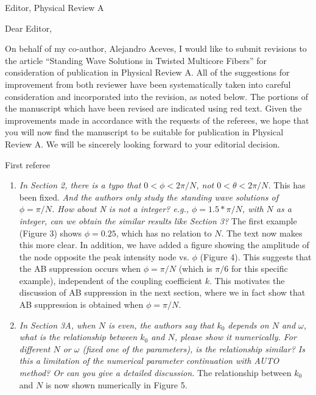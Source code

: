 \documentclass[11pt]{letter}
\begin{document}
\address{Ross Parker \\
Department of Mathematics \\
Southern Methodist University \\
Dallas, TX 75275 \\
\texttt{rhparker@smu.edu}}%
\signature{Ross Parker}
\begin{letter}{Editor, Physical Review A}

\opening{Dear Editor,}

On behalf of my co-author, Alejandro Aceves, I would like to submit revisions to the article ``Standing Wave Solutions in Twisted Multicore Fibers'' for consideration of publication in Physical Review A. All of the suggestions for improvement from both reviewer have been systematically taken into careful consideration and incorporated into the revision, as noted below. The portions of the manuscript which have been revised are indicated using red text. Given the improvements made in accordance with the requests of the referees, we hope that you will now find the manuscript to be suitable for publication in Physical Review A. We will be sincerely looking forward to your editorial decision.

First referee
\begin{enumerate}
\item \emph{In Section 2, there is a typo that $0<\phi<2\pi/N$, not $0<\theta<2\pi/N$.} This has been fixed. \emph{And the authors only study the standing wave solutions of $\phi=\pi/N$. How about N is not a integer? e.g., $\phi=1.5*\pi/N$, with $N$ as a integer, can we obtain the similar results like Section 3?} The first example (Figure 3) shows $\phi = 0.25$, which has no relation to $N$. The text now makes this more clear. In addition, we have added a figure showing the amplitude of the node opposite the peak intensity node vs. $\phi$ (Figure 4). This suggests that the AB suppression occurs when $\phi = \pi/N$ (which is $\pi/6$ for this specific example), independent of the coupling coefficient $k$. This motivates the discussion of AB suppression in the next section, where we in fact show that AB suppression is obtained when $\phi = \pi/N$.

\item \emph{In Section 3A, when $N$ is even, the authors say that $k_0$ depends on $N$ and $\omega$, what is the relationship between $k_0$ and $N$, please show it numerically. For different $N$ or $\omega$ (fixed one of the parameters), is the relationship similar? Is this a limitation of the numerical parameter continuation with AUTO method? Or can you give a detailed discussion.} The relationship between $k_0$ and $N$ is now shown numerically in Figure 5.


\end{enumerate}
\end{letter}
\end{document}
